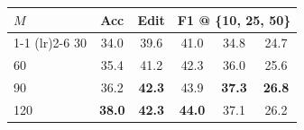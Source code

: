 \begin{table}[!t]
\centering
\begin{tabular}{lccccc}
\toprule
$M$ & Acc &Edit & \multicolumn{3}{c}{F1 @ \{10, 25, 50\}} \\ \cmidrule(lr){1-1} \cmidrule(lr){2-6}
30 &  34.0 &  39.6 &  41.0 &  34.8 & 24.7 \\ 
\rowcolor{gray!30}
60 &  35.4 &  41.2 &  42.3 &  36.0 & 25.6 \\ 
90 &  36.2 &  \textbf{42.3} &  43.9 &  \textbf{37.3} & \textbf{26.8} \\ 
120 &  \textbf{38.0} &  \textbf{42.3} &  \textbf{44.0} &  37.1 & 26.2 \\ \bottomrule
\end{tabular}
\label{tab:mem}
\end{table}
